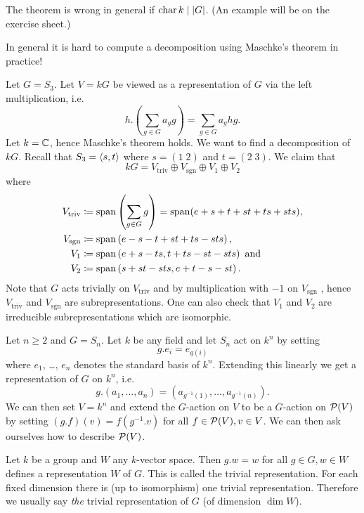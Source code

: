 \begin{warn}
 The theorem is wrong in general if $\operatorname{char} k \mid |G|$. (An example will be on the exercise sheet.)
\end{warn}

\begin{expl}
 In general it is hard to compute a decomposition using Maschke’s theorem in practice!
 
 Let $G = S_3$. Let $V = kG$ be viewed as a representation of $G$ via the left multiplication, i.e.
 \[
  h.\left(\sum_{g \in G} a_g g\right) = \sum_{g \in G} a_g hg.
 \]
 Let $k = \mathbb{C}$, hence Maschke’s theorem holds. We want to find a decomposition of $kG$. Recall that $S_3 = \left\langle s,t \right\rangle$ where $s = (1 \; 2)$ and $t = (2 \; 3)$. We claim that
 \[
  kG = V_{\text{triv}} \oplus V_{\text{sgn}} \oplus V_1 \oplus V_2
 \]
 where
 \begin{align*}
  V_{\text{triv}} &\coloneqq \operatorname{span}\left(\sum_{g \in G} g \right) = \operatorname{span}(e+s+t+st+ts+sts), \\
  V_{\text{sgn}} &\coloneqq \operatorname{span}\left(e-s-t+st+ts-sts\right), \\
  V_1 &\coloneqq \operatorname{span}\left(e+s-ts, t+ts-st-sts\right) \text{ and} \\
  V_2 &\coloneqq \operatorname{span}\left(s+st-sts,e+t-s-st\right).
 \end{align*}
 Note that $G$ acts trivially on $V_{\text{triv}}$ and by multiplication with $-1$ on $V_{\text{sgn}}$ , hence $V_{\text{triv}}$ and $V_{\text{sgn}}$ are subrepresentations. One can also check that $V_1$ and $V_2$ are irreducible subrepresentations which are isomorphic.
\end{expl}


\begin{expl}
 Let $n \geq 2$ and $G = S_n$. Let $k$ be any field and let $S_n$ act on $k^n$ by setting
 \[
  g.e_i = e_{g(i)}
 \]
 where $e_1$, \dots, $e_n$ denotes the standard basis of $k^n$. Extending this linearly we get a representation of $G$ on $k^n$, i.e.
 \[
  g.(a_1, \dotsc, a_n) = \left(a_{g^{-1}(1)}, \dotsc, a_{g^{-1}(n)}\right).
 \]
 We can then set $V = k^n$ and extend the $G$-action on $V$ to be a $G$-action on $\mathcal{P}(V)$ by setting $(g.f)(v) = f(g^{-1}.v)$ for all $f \in \mathcal{P}(V), v \in V$. We can then ask ourselves how to describe $\mathcal{P}(V)$.
\end{expl}


\begin{defi}
 Let $k$ be a group and $W$ any $k$-vector space. Then $g.w = w$ for all $g \in G, w \in W$ defines a representation $W$ of $G$. This is called the trivial representation. For each fixed dimension there is (up to isomorphism) one trivial representation. Therefore we usually say \emph{the} trivial representation of $G$ (of dimension $\dim W$).
\end{defi}


